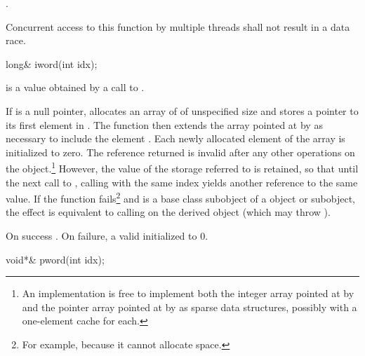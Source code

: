 \begin{itemdescr}
\pnum
\returns
{}
\tcode{++}.

\pnum
\remarks
Concurrent access to this function by multiple threads shall not result in a data
race.
\end{itemdescr}

%
\begin{itemdecl}
long& iword(int idx);
\end{itemdecl}

\begin{itemdescr}
\pnum
\requires
{} is a value obtained by a call to .

\pnum
\effects
If  is a null pointer, allocates an array of
of unspecified size and stores a pointer to its first element in
.
The function then extends the array pointed at by
 as necessary to include the element
.
Each newly allocated element of the array is initialized to zero.
The reference returned is invalid after any other operations on the
object.\footnote{An implementation is free to implement both the integer
array pointed at by  and the pointer array pointed at by
 as sparse data structures, possibly with a one-element
cache for each.}
However, the value of the storage referred to is retained, so
that until the next call to
,
calling
with the same index yields another reference to the same value.
If the function fails\footnote{For example, because it cannot allocate space.}
and
is a base class subobject of a
object or subobject, the effect is equivalent to calling
on the derived object (which may throw
).

\pnum
\returns
On success
.
On failure, a valid
initialized to 0.
\end{itemdescr}

%
\begin{itemdecl}
void*& pword(int idx);
\end{itemdecl}

